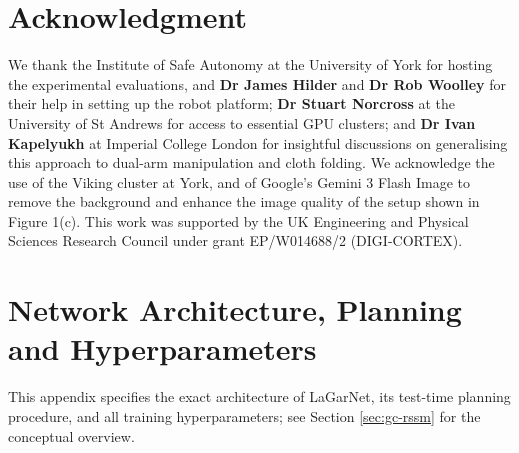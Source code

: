 \documentclass[journal]{IEEEtran}
\newif\ifshowrev\showrevtrue
\newcommand{\rev}[1]{\ifshowrev\textcolor{revblue}{#1}\else#1\fi}
\begin{document}
\section*{Acknowledgment}
\rev{We thank the Institute of Safe Autonomy at the University of York for hosting the experimental evaluations, and \textbf{Dr James Hilder} and \textbf{Dr Rob Woolley} for their help in setting up the robot platform; \textbf{Dr Stuart Norcross} at the University of St Andrews for access to essential GPU clusters; and \textbf{Dr Ivan Kapelyukh} at Imperial College London for insightful discussions on generalising this approach to dual-arm manipulation and cloth folding. We acknowledge the use of the Viking cluster at York, and of Google's Gemini 3 Flash Image to remove the background and enhance the image quality of the setup shown in Figure 1(c). This work was supported by the UK Engineering and Physical Sciences Research Council under grant EP/W014688/2 (DIGI-CORTEX).}


% 
% 


\clearpage

\appendices

\section{Network Architecture, Planning and Hyperparameters} \label{sec:architecture}

\rev{This appendix specifies the exact architecture of LaGarNet, its test-time planning procedure, and all training hyperparameters; see Section \ref{sec:gc-rssm} for the conceptual overview.}
\end{document}
